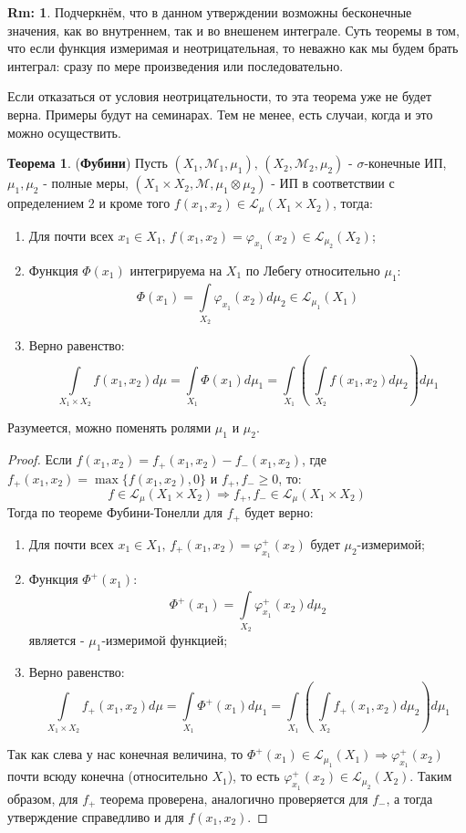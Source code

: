\documentclass[12pt]{article}
\newcommand{\ML}{\mathcal{L}}
\newcommand{\MM}{\mathcal{M}}
\theoremstyle{definition}
\newtheorem{rem}{Rm:}
\newtheorem{theorem}{Теорема}
\newcommand{\ddint}[2]{\displaystyle\int\limits_{#1}^{#2}}
\begin{document}
\begin{rem}
	Подчеркнём, что в данном утверждении возможны бесконечные значения, как во внутреннем, так и во внешенем интеграле. Суть теоремы в том, что если функция измеримая и неотрицательная, то неважно как мы будем брать интеграл: сразу по мере произведения или последовательно. 
	
	Если отказаться от условия неотрицательности, то эта теорема уже не будет верна. Примеры будут на семинарах. Тем не менее, есть случаи, когда и это можно осуществить.
\end{rem}

\begin{theorem}(\textbf{Фубини})
	Пусть $(X_1,\MM_1, \mu_1), \, (X_2, \MM_2, \mu_2)$ - $\sigma$-конечные ИП, $\mu_1, \mu_2$ - полные меры, $(X_1 \times X_2, \MM, \mu_1 \otimes \mu_2)$ - ИП в соответствии с определением $2$ и кроме того $f(x_1,x_2) \in \ML_{\mu}(X_1 \times X_2)$, тогда:
	\begin{enumerate}[label=\arabic*)]
		\item Для почти всех $x_1\in X_1, \, f(x_1,x_2) = \varphi_{x_1}(x_2) \in \ML_{\mu_2}(X_2)$;
		\item Функция $\Phi(x_1)$ интегрируема на $X_1$ по Лебегу относительно $\mu_1$:
		$$
			\Phi(x_1) = \ddint{X_2}{} \varphi_{x_1}(x_2)d\mu_2 \in \ML_{\mu_1}(X_1)
		$$ 
		\item Верно равенство:
		$$
			\ddint{X_1 \times X_2}{}f(x_1,x_2)d\mu = \ddint{X_1}{}\Phi(x_1)d\mu_1 = \ddint{X_1}{}\left(\; \ddint{X_2}{}f(x_1,x_2)d\mu_2\right)d\mu_1
		$$
	\end{enumerate}
	Разумеется, можно поменять ролями $\mu_1$ и $\mu_2$.
\end{theorem}
\begin{proof}
	Если $f(x_1,x_2) = f_+(x_1,x_2) - f_-(x_1,x_2)$, где $f_+(x_1,x_2) = \max\{f(x_1,x_2),0\}$ и $f_+, f_- \geq 0$, то: 
	$$
		f\in \ML_\mu(X_1 \times X_2) \Rightarrow f_+, f_- \in \ML_\mu(X_1 \times X_2)
	$$
	Тогда по теореме Фубини-Тонелли для $f_+$ будет верно:
	\begin{enumerate}[label=\arabic*)]
		\item Для почти всех $x_1\in X_1, \, f_+(x_1,x_2) = \varphi_{x_1}^+(x_2)$ будет $\mu_2$-измеримой;
		\item Функция $\Phi^+(x_1)$:
		$$
			\Phi^+(x_1) = \ddint{X_2}{} \varphi_{x_1}^+(x_2)d\mu_2
		$$ 
		является - $\mu_1$-измеримой функцией;
		\item Верно равенство:
		$$
			\ddint{X_1 \times X_2}{}f_+(x_1,x_2)d\mu = \ddint{X_1}{}\Phi^+(x_1)d\mu_1 = \ddint{X_1}{}\left(\; \ddint{X_2}{}f_+(x_1,x_2)d\mu_2\right)d\mu_1
		$$
	\end{enumerate}
	Так как слева у нас конечная величина, то $\Phi^+(x_1) \in \ML_{\mu_1}(X_1) \Rightarrow \varphi_{x_1}^+(x_2)$ почти всюду конечна (относительно $X_1$), то есть $\varphi_{x_1}^+(x_2) \in \ML_{\mu_2}(X_2)$. Таким образом, для $f_+$ теорема проверена, аналогично проверяется для $f_-$, а тогда утверждение справедливо и для $f(x_1,x_2)$.
\end{proof}
\end{document}
